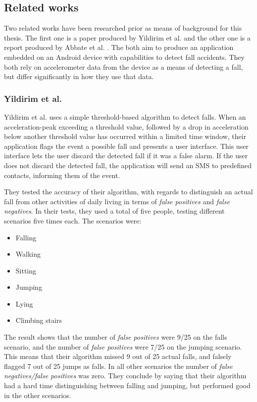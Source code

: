 \documentclass[12pt, a4paper, onecolumn]{article}
\begin{document}
	
	\subsection{Related works} Two related works have been researched prior as means of background for this thesis. The first one is a paper produced by Yildirim et al. \cite{int_journ} and the other one is a report produced by Abbate et al. \cite{piza_uni}. The both aim to produce an application embedded on an Android device with capabilities to detect fall accidents. They both rely on accelerometer data from the device as a means of detecting a fall, but differ significantly in how they use that data. 
	
	\subsubsection{Yildirim et al.}
	Yildirim et al. \cite{int_journ} uses a simple threshold-based algorithm to detect falls. When an acceleration-peak exceeding a threshold value, followed by a drop in acceleration below another threshold value has occurred within a limited time window, their application flags the event a possible fall and presents a user interface. This user interface lets the user discard the detected fall if it was a false alarm. If the user does not discard the detected fall, the application will send an SMS to predefined contacts, informing them of the event. 
	
	They tested the accuracy of their algorithm, with regards to distinguish an actual fall from other activities of daily living in terms of \textit{false positives} and \textit{false negatives}. In their tests, they used a total of five people, testing different scenarios five times each. The scenarios were:
	
	\begin{itemize}
		\item Falling
		\item Walking
		\item Sitting
		\item Jumping
		\item Lying
		\item Climbing stairs
	\end{itemize}
	
	The result shows that the number of \textit{false positives} were 9/25 on the falls scenario, and the number of \textit{false positives} were 7/25 on the jumping scenario. This means that their algorithm missed 9 out of 25 actual falls, and falsely flagged 7 out of 25 jumps as falls. In all other scenarios the number of \textit{false negatives/false positives} was zero. They conclude by saying that their algorithm had a hard time distinguishing between falling and jumping, but performed good in the other scenarios. 
	
\end{document}

